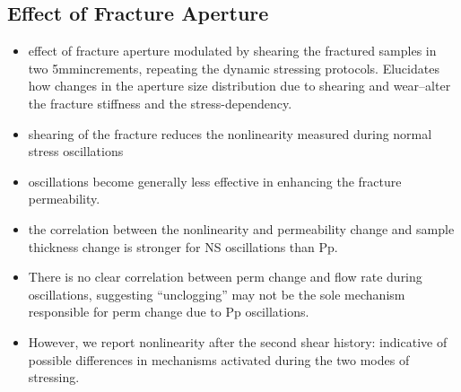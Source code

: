 \documentclass[letterpaper,10pt]{article}
\begin{document}
\subsection{Effect of Fracture Aperture}
\begin{itemize}
	\item effect of fracture aperture modulated by shearing the fractured samples in two 5mmincrements, repeating the dynamic stressing protocols. Elucidates how changes in the aperture size distribution due to shearing and wear–alter the fracture stiffness and the stress-dependency.
	\item shearing of the fracture reduces the nonlinearity measured during normal stress oscillations
	\item oscillations become generally less effective in enhancing the fracture permeability.
	\item the correlation between the nonlinearity and permeability change and sample thickness change is stronger for NS oscillations than Pp. 
	\item There is no clear correlation between perm change and flow rate during oscillations, suggesting “unclogging” may not be the sole mechanism responsible for perm change due to Pp oscillations. 
	\item However, we report nonlinearity after the second shear history: indicative of possible differences in mechanisms activated during the two modes of stressing.
\end{itemize}

\end{document}
